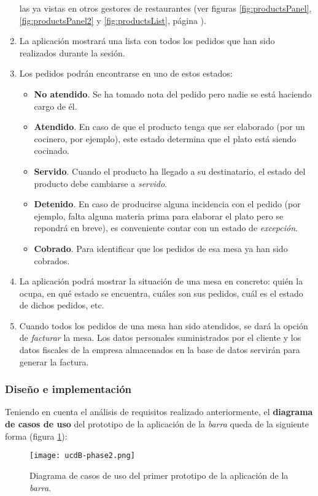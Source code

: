 \begin{enumerate}
las ya vistas en otros gestores de restaurantes (ver figuras
\ref{fig:productsPanel}, \ref{fig:productsPanel2} y \ref{fig:productsList},
página \pageref{fig:productsPanel}).
\item La aplicación mostrará una lista con todos los pedidos que han sido
realizados durante la sesión.
\item Los pedidos podrán encontrarse en uno de estos estados:
  \begin{itemize}
  \item \textbf{No atendido}. Se ha tomado nota del pedido pero nadie se está
  haciendo cargo de él.
  \item \textbf{Atendido}. En caso de que el producto tenga que ser elaborado
  (por un cocinero, por ejemplo), este estado determina que el plato está
  siendo cocinado.
  \item \textbf{Servido}. Cuando el producto ha llegado a su destinatario, el
  estado del producto debe cambiarse a \emph{servido}.
  \item \textbf{Detenido}. En caso de producirse alguna incidencia con el
  pedido (por ejemplo, falta alguna materia prima para elaborar
  el plato pero se repondrá en breve), es conveniente contar con un estado
  de \emph{excepción}.
  \item \textbf{Cobrado}. Para identificar que los pedidos de esa mesa ya han
  sido cobrados.
  \end{itemize}
\item La aplicación podrá mostrar la situación de una mesa en concreto: quién
la ocupa, en qué estado se encuentra, cuáles son sus pedidos, cuál es el
estado de dichos pedidos, etc.
\item Cuando todos los pedidos de una mesa han sido atendidos, se dará la
opción de \emph{facturar} la mesa. Los datos personales suministrados por el
cliente y los datos fiscales de la empresa almacenados en la base de datos
servirán para generar la factura.
\end{enumerate}

\subsubsection{Diseño e implementación}
Teniendo en cuenta el análisis de requisitos realizado anteriormente, el
\textbf{diagrama de casos de uso} del prototipo de la aplicación de la
\emph{barra} queda de la siguiente forma (figura \ref{fig:ucdB-phase2}):

  \begin{figure}[!h]
    \begin{center}
      \texttt{[image: ucdB-phase2.png]}
      \caption{Diagrama de casos de uso del primer prototipo de la aplicación
      de la \emph{barra}.}
      \label{fig:ucdB-phase2}
    \end{center}
  \end{figure}

